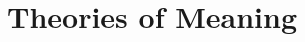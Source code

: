 \documentclass[12pt]{report}
\begin{document}
\tableofcontents




\chapter{Theories of Meaning}
\label{chp:theories_of_meaning}








\end{document}
